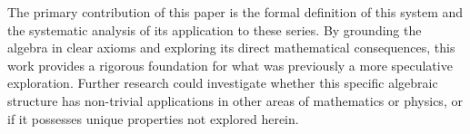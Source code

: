 \documentclass[12pt, letterpaper]{article}
\begin{document}
The primary contribution of this paper is the formal definition of this system and the systematic analysis of its application to these series. By grounding the algebra in clear axioms and exploring its direct mathematical consequences, this work provides a rigorous foundation for what was previously a more speculative exploration. Further research could investigate whether this specific algebraic structure has non-trivial applications in other areas of mathematics or physics, or if it possesses unique properties not explored herein.
\end{document}
